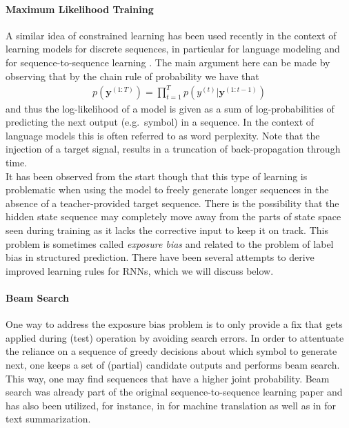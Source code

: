 \documentclass{article}
\newcommand{\up}[1]{^{(#1)}}
\newcommand{\y}{{\mathbf y}}
\begin{document}
\paragraph{Maximum Likelihood Training} A similar idea of  constrained learning has been used recently in the context of learning models for discrete sequences, in particular for language modeling and for  sequence-to-sequence learning \cite{sutskever2014sequence}. The main argument here can be made by observing that by the chain rule of probability we have that 
\begin{align}
p(\y \up{1:T}) = \prod_{t=1}^T p(y \up t | \y \up{1:t-1})
\end{align}
and thus the log-likelihood of a model is given as a sum of log-probabilities of predicting the next output (e.g.~symbol) in a sequence. In the context of language models this is often referred to as word perplexity. Note that the injection of a target signal, results in a truncation of back-propagation through time. \\

\noindent It has been observed from the start though that this type of learning is problematic when using the model to freely generate longer sequences in the absence of a teacher-provided target sequence. There is the possibility that the hidden state sequence may completely move away from the parts of state space seen during training as it lacks the corrective input to keep it on track. This problem is sometimes called \textit{exposure bias} \cite{ranzato2015sequence} and related to the problem of label bias \cite{lafferty2001conditional} in structured prediction. There have been several attempts to derive improved learning rules for RNNs, which we will discuss below. 

\paragraph{Beam Search} One way to address the exposure bias problem is to only provide a fix that gets applied during (test) operation by avoiding search errors. In order to attentuate the reliance on a sequence of greedy decisions about which symbol to generate next, one keeps a set of (partial) candidate outputs and performs beam search. This way, one may find sequences that have a higher joint probability. Beam search was already part of the original sequence-to-sequence learning paper \cite{sutskever2014sequence} and has also been utilized, for instance, in \cite{bahdanau2014neural} for machine translation as well as in \cite{rush2015neural} for text summarization.
\end{document}

